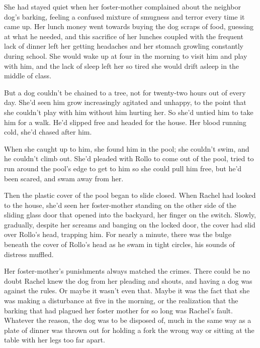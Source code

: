 She had stayed quiet when her foster-mother complained about the neighbor dog's barking, feeling a confused mixture of smugness and terror every time it came up.  Her lunch money went towards buying the dog scraps of food, guessing at what he needed, and this sacrifice of her lunches coupled with the frequent lack of dinner left her getting headaches and her stomach growling constantly during school.  She would wake up at four in the morning to visit him and play with him, and the lack of sleep left her so tired she would drift asleep in the middle of class.



But a dog couldn't be chained to a tree, not for twenty-two hours out of every day.  She'd seen him grow increasingly agitated and unhappy, to the point that she couldn't play with him without him hurting her.  So she'd untied him to take him for a walk.  He'd slipped free and headed for the house.  Her blood running cold, she'd chased after him.



When she caught up to him, she found him in the pool; she couldn't swim, and he couldn't climb out.  She'd pleaded with Rollo to come out of the pool, tried to run around the pool's edge to get to him so she could pull him free, but he'd been scared, and swam away from her.



Then the plastic cover of the pool began to slide closed.  When Rachel had looked to the house, she'd seen her foster-mother standing on the other side of the sliding glass door that opened into the backyard, her finger on the switch.  Slowly, gradually, despite her screams and banging on the locked door, the cover had slid over Rollo's head, trapping him.  For nearly a minute, there was the bulge beneath the cover of Rollo's head as he swam in tight circles, his sounds of distress muffled.



Her foster-mother's punishments always matched the crimes.  There could be no doubt Rachel knew the dog from her pleading and shouts, and having a dog was against the rules.  Or maybe it wasn't even that.  Maybe it was the fact that she was making a disturbance at five in the morning, or the realization that the barking that had plagued her foster mother for so long was Rachel's fault.  Whatever the reason, the dog was to be disposed of, much in the same way as a plate of dinner was thrown out for holding a fork the wrong way or sitting at the table with her legs too far apart.



